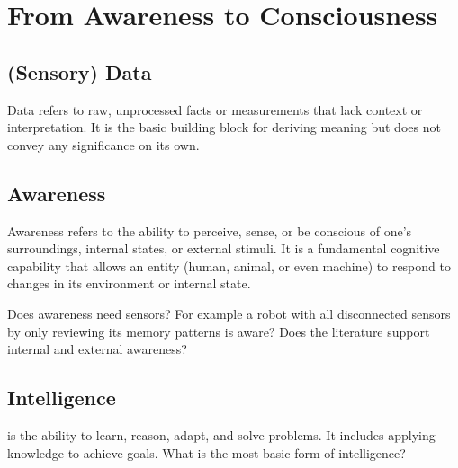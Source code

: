 \chapter{From Awareness to Consciousness}
\section{(Sensory) Data} Data refers to raw, unprocessed facts or measurements that lack context or interpretation. It is the basic building block for deriving meaning but does not convey any significance on its own.

\section{Awareness} 
Awareness refers to the ability to perceive, sense, or be conscious of one’s surroundings, internal states, or external stimuli. It is a fundamental cognitive capability that allows an entity (human, animal, or even machine) to respond to changes in its environment or internal state.

Does awareness need sensors? For example a robot with all disconnected sensors by only reviewing its memory patterns is aware? Does the literature support internal and external awareness?



        
\section{Intelligence}  is the ability to learn, reason, adapt, and solve problems. It includes applying knowledge to achieve goals. What is the most basic form of intelligence?


        
